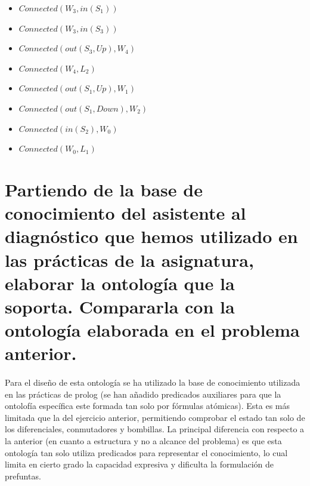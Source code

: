 \documentclass[10pt, a4paper,spanish]{article}
\begin{document}
\begin{itemize}
\begin{itemize}
					\item $ Connected(W_3, in(S_1))$
					\item $ Connected(W_3, in(S_3))$
					\item $ Connected(out(S_3, Up), W_4)$
					\item $ Connected(W_4, L_2)$
					\item $ Connected(out(S_1, Up), W_1)$
					\item $ Connected(out(S_1, Down), W_2)$
					\item $ Connected(in(S_2), W_0)$
					\item $ Connected(W_0, L_1)$
				\end{itemize}
			\end{itemize}



	\clearpage
	\section{Partiendo de la base de conocimiento del asistente al diagnóstico que hemos utilizado en las prácticas de la asignatura, elaborar la ontología que la soporta. Compararla con la ontología elaborada en el problema anterior.}

		\paragraph{}
		Para el diseño de esta ontología se ha utilizado la base de conocimiento utilizada en las prácticas de prolog (se han añadido predicados auxiliares para que la ontolofía específica este formada tan solo por fórmulas atómicas). Esta es más limitada que la del ejercicio anterior, permitiendo comprobar el estado tan solo de los diferenciales, conmutadores y bombillas. La principal diferencia con respecto a la anterior (en cuanto a estructura y no a alcance del problema) es que esta ontología  tan solo utiliza predicados para representar el conocimiento, lo cual limita en cierto grado la capacidad expresiva y dificulta la formulación de prefuntas.
\end{document}
